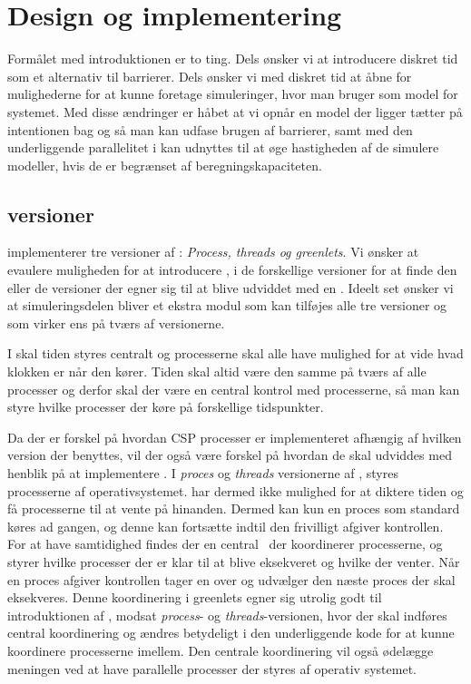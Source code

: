 
\section{Design og implementering}
Formålet med introduktionen er to ting. Dels ønsker vi at introducere diskret tid som et alternativ til barrierer. Dels ønsker vi med diskret tid at åbne for mulighederne for at kunne foretage simuleringer, hvor man bruger \csp som model for systemet. Med disse ændringer er håbet at vi opnår en model der ligger tætter på intentionen bag \csp og så man kan udfase brugen af barrierer, samt med den underliggende parallelitet i \csp kan udnyttes til at øge hastigheden af de simulere modeller, hvis de er begrænset af beregningskapaciteten.

\subsection{\pycsp versioner}
\pycsp implementerer tre versioner af \csp: \emph{Process, threads og greenlets}\cite{Friborg2009}. Vi ønsker at evaulere muligheden for at introducere \des, i de forskellige versioner for at finde den eller de versioner der egner sig til at blive  udviddet med en \des. Ideelt set ønsker vi at simuleringsdelen bliver et ekstra modul som kan tilføjes alle tre versioner og som virker ens på tværs af versionerne.  

I \des  skal tiden styres centralt og processerne skal alle have mulighed for at vide hvad klokken er når den kører. Tiden skal altid være den samme på tværs af alle processer og derfor skal der være en central kontrol med processerne, så man kan styre hvilke processer der køre på forskellige tidspunkter.

Da der er forskel på hvordan CSP processer er implementeret afhængig af hvilken version der benyttes, vil der også være forskel på hvordan de skal udviddes med henblik på at implementere \des. 
I  \emph{proces} og \emph{threads} versionerne af \pycsp, styres processerne af operativsystemet. \pycsp har dermed ikke mulighed for at diktere tiden og få processerne til at vente på hinanden. Dermed kan kun en proces som standard køres ad gangen, og denne kan fortsætte indtil den frivilligt afgiver kontrollen. For at have samtidighed findes der en central \sched ~der koordinerer processerne, og styrer hvilke processer der er klar til at blive eksekveret og hvilke der venter. Når en proces afgiver kontrollen tager \sched en over og udvælger den næste proces der skal eksekveres. Denne koordinering i greenlets egner sig utrolig godt til introduktionen af \des, modsat \emph{process}- og \emph{threads}-versionen, hvor der skal indføres central koordinering og ændres betydeligt i den underliggende kode for at kunne koordinere processerne imellem. Den centrale koordinering vil også ødelægge meningen ved at have parallelle processer der styres af operativ systemet.

